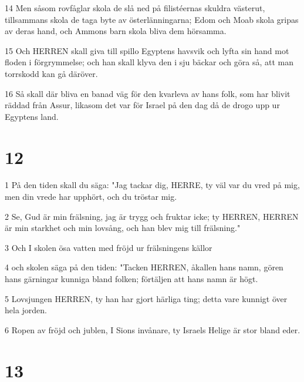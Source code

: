 \par 14 Men såsom rovfåglar skola de slå ned på filistéernas skuldra västerut, tillsammans skola de taga byte av österlänningarna; Edom och Moab skola gripas av deras hand, och Ammons barn skola bliva dem hörsamma.
\par 15 Och HERREN skall giva till spillo Egyptens havsvik och lyfta sin hand mot floden i förgrymmelse; och han skall klyva den i sju bäckar och göra så, att man torrskodd kan gå däröver.
\par 16 Så skall där bliva en banad väg för den kvarleva av hans folk, som har blivit räddad från Assur, likasom det var för Israel på den dag då de drogo upp ur Egyptens land.

\chapter{12}

\par 1 På den tiden skall du säga: "Jag tackar dig, HERRE, ty väl var du vred på mig, men din vrede har upphört, och du tröstar mig.
\par 2 Se, Gud är min frälsning, jag är trygg och fruktar icke; ty HERREN, HERREN är min starkhet och min lovsång, och han blev mig till frälsning."
\par 3 Och I skolen ösa vatten med fröjd ur frälsningens källor
\par 4 och skolen säga på den tiden: "Tacken HERREN, åkallen hans namn, gören hans gärningar kunniga bland folken; förtäljen att hans namn är högt.
\par 5 Lovsjungen HERREN, ty han har gjort härliga ting; detta vare kunnigt över hela jorden.
\par 6 Ropen av fröjd och jublen, I Sions invånare, ty Israels Helige är stor bland eder.

\chapter{13}

